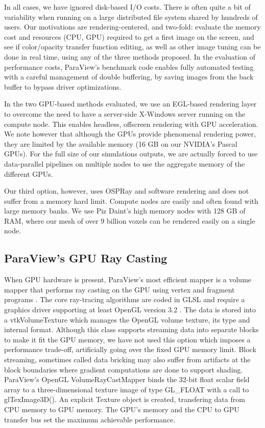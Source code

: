 \documentclass[5p,times]{elsarticle}
\begin{document}
In all cases, we have ignored disk-based I/O costs. There is often quite
a bit of variability when running on a large distributed file system shared by
hundreds of users. Our motivations are rendering-centered, and two-fold:
evaluate the memory cost and resources (CPU, GPU) required to get a first image
on the screen, and see if color/opacity transfer
function editing, as well as other image tuning can be done in real time, using
any of the three methods proposed. In the evaluation of performance costs, ParaView's
benchmark code enables fully automated testing with a careful management of
double buffering, by saving images from the back buffer to bypass driver optimizations.

In the two GPU-based methods evaluated, we use an EGL-based rendering layer \cite{EGL} to
overcome the need to have a server-side X-Windows server running on the compute node.
This enables headless, offscreen rendering with GPU acceleration. We note however that although
the GPUs provide phenomenal rendering power, they are limited by the available memory
(16 GB on our NVIDIA's Pascal GPUs). For the full size of our simulations outputs,
we are actually forced to use data-parallel pipelines on multiple nodes to use
the aggregate memory of the different GPUs.

Our third option, however, uses OSPRay and software rendering and does not suffer
from a memory hard limit. Compute nodes are easily and often found with large memory
banks. We use Piz Daint's high memory nodes with 128 GB of RAM, where our mesh of
over 9 billion voxels can be rendered easily on a single node.


\subsection{ParaView's GPU Ray Casting} \label{smart}

When GPU hardware is present, ParaView's most efficient mapper is a volume
mapper that performs ray casting on the GPU using vertex and fragment programs \cite{KitwareBlog}.
The core ray-tracing algorithms are coded in GLSL and require a graphics driver
supporting at least OpenGL version 3.2 \cite{ShadersInVTK}. The data is stored
into a vtkVolumeTexture which manages the OpenGL volume texture, its type and
internal format. Although this class supports streaming data into separate blocks
to make it fit the GPU memory, we have not used this option which imposes
a performance trade-off, artificially going over the fixed GPU memory limit.
Block streaming, sometimes called data bricking may also suffer from artifacts at
the block boundaries where gradient computations are done to support shading.
ParaView's OpenGL VolumeRayCastMapper binds the 32-bit float scalar field array
to a three-dimensional texture image of type GL\_FLOAT with a call to glTexImage3D().
An explicit Texture object is created, transfering data from CPU memory to GPU memory.
The GPU's memory and the CPU to GPU transfer bus set the maximum achievable performance.
\end{document}
